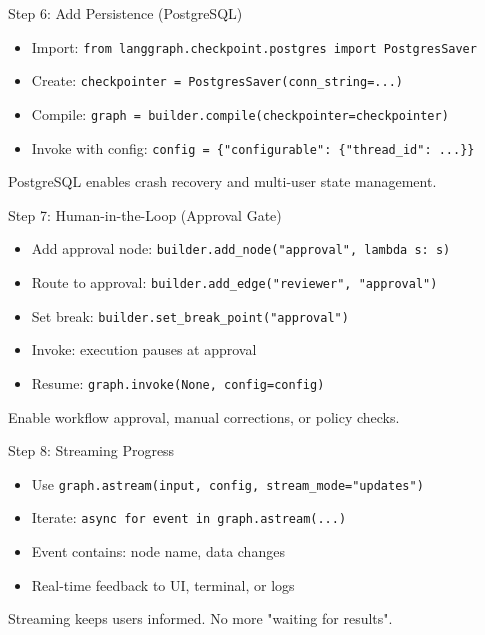 \documentclass[aspectratio=169,11pt]{beamer}
\begin{document}
\begin{frame}{Step 6: Add Persistence (PostgreSQL)}
\setlength{\itemsep}{1pt}
\begin{itemize}
\item Import: \texttt{from langgraph.checkpoint.postgres import PostgresSaver}
\item Create: \texttt{checkpointer = PostgresSaver(conn\_string=...)}
\item Compile: \texttt{graph = builder.compile(checkpointer=checkpointer)}
\item Invoke with config: \texttt{config = \{"configurable": \{"thread\_id": ...\}\}}
\end{itemize}
\vspace{0.1cm}
\begin{tipbox}[Durability]
PostgreSQL enables crash recovery and multi-user state management.
\end{tipbox}
\end{frame}

\begin{frame}{Step 7: Human-in-the-Loop (Approval Gate)}
\setlength{\itemsep}{1pt}
\begin{itemize}
\item Add approval node: \texttt{builder.add\_node("approval", lambda s: s)}
\item Route to approval: \texttt{builder.add\_edge("reviewer", "approval")}
\item Set break: \texttt{builder.set\_break\_point("approval")}
\item Invoke: execution pauses at approval
\item Resume: \texttt{graph.invoke(None, config=config)}
\end{itemize}
\vspace{0.1cm}
\begin{tipbox}
Enable workflow approval, manual corrections, or policy checks.
\end{tipbox}
\end{frame}

\begin{frame}{Step 8: Streaming Progress}
\setlength{\itemsep}{1pt}
\begin{itemize}
\item Use \texttt{graph.astream(input, config, stream\_mode="updates")}
\item Iterate: \texttt{async for event in graph.astream(...)}
\item Event contains: node name, data changes
\item Real-time feedback to UI, terminal, or logs
\end{itemize}
\vspace{0.1cm}
\begin{tipbox}
Streaming keeps users informed. No more "waiting for results".
\end{tipbox}
\end{frame}
\end{document}
